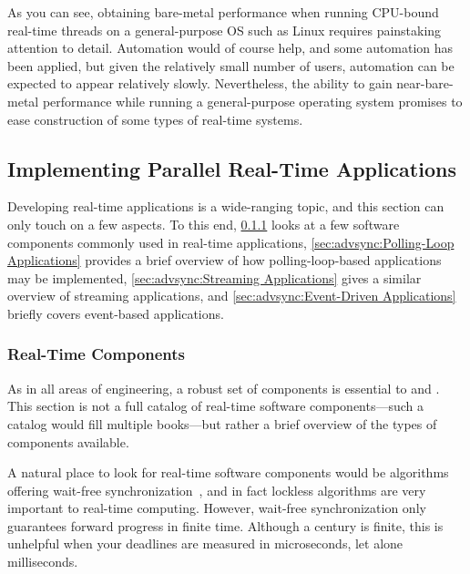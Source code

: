 As you can see, obtaining bare-metal performance when running
CPU-bound real-time threads on a general-purpose OS such as Linux
requires painstaking attention to detail.
Automation would of course help, and some automation has been applied,
but given the relatively small number of users, automation can be
expected to appear relatively slowly.
Nevertheless, the ability to gain near-bare-metal performance while
running a general-purpose operating system promises to ease construction
of some types of real-time systems.

\subsection{Implementing Parallel Real-Time Applications}
\label{sec:advsync:Implementing Parallel Real-Time Applications}

Developing real-time applications is a wide-ranging topic, and this
section can only touch on a few aspects.
To this end,
\cref{sec:advsync:Real-Time Components}
looks at a few software components commonly used in real-time applications,
\cref{sec:advsync:Polling-Loop Applications}
provides a brief overview of how polling-loop-based applications may
be implemented,
\cref{sec:advsync:Streaming Applications}
gives a similar overview of streaming applications, and
\cref{sec:advsync:Event-Driven Applications}
briefly covers event-based applications.

\subsubsection{Real-Time Components}
\label{sec:advsync:Real-Time Components}

As in all areas of engineering, a robust set of components is essential
to  and .
This section is not a full catalog of real-time software components---such
a catalog would fill multiple books---but rather a brief overview of the
types of components available.

A natural place to look for real-time software components would be
algorithms offering wait-free
synchronization~\cite{Herlihy91}, and in fact lockless
algorithms are very important to real-time computing.
However, wait-free synchronization only guarantees forward progress in
finite time.
Although a century is finite, this is unhelpful when your deadlines are
measured in microseconds, let alone milliseconds.


